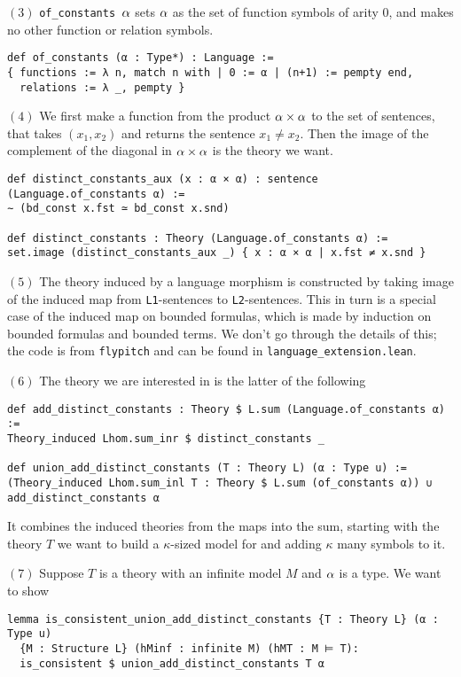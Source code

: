 $(3)$ \texttt{of\_constants $\alpha$} sets $\alpha$ as the set of function symbols
of arity $0$, and makes no other function or relation symbols.
\begin{lstlisting}
def of_constants (α : Type*) : Language :=
{ functions := λ n, match n with | 0 := α | (n+1) := pempty end,
  relations := λ _, pempty } \end{lstlisting}

$(4)$ We first make a function from the product $\alpha \times \alpha$ to
the set of sentences, that takes $(x_1,x_2)$ and returns the sentence
$x_{1} \ne x_{2}$.
Then the image of the complement of the diagonal in $\alpha \times \alpha$
is the theory we want.

\begin{lstlisting}
def distinct_constants_aux (x : α × α) : sentence (Language.of_constants α) :=
∼ (bd_const x.fst ≃ bd_const x.snd)

def distinct_constants : Theory (Language.of_constants α) :=
set.image (distinct_constants_aux _) { x : α × α | x.fst ≠ x.snd } \end{lstlisting}

$(5)$ The theory induced by a language morphism is constructed by
taking image of the induced map from \texttt{L1}-sentences
to \texttt{L2}-sentences.
This in turn is a special case of the induced map on bounded formulas,
which is made by induction on bounded formulas and bounded terms.
We don't go through the details of this;
the code is from \texttt{flypitch} and can be found in
\texttt{language\_extension.lean}.

$(6)$ The theory we are interested in is the latter of the following
\begin{lstlisting}
def add_distinct_constants : Theory $ L.sum (Language.of_constants α) :=
Theory_induced Lhom.sum_inr $ distinct_constants _

def union_add_distinct_constants (T : Theory L) (α : Type u) :=
(Theory_induced Lhom.sum_inl T : Theory $ L.sum (of_constants α)) ∪ add_distinct_constants α \end{lstlisting}
It combines the induced theories from the maps into the sum,
starting with the theory $T$ we want to build a $\kappa$-sized
model for and adding $\kappa$ many symbols to it.

$(7)$ Suppose $T$ is a theory with an infinite model $M$ and $\alpha$ is a type.
We want to show

\begin{lstlisting}
lemma is_consistent_union_add_distinct_constants {T : Theory L} (α : Type u)
  {M : Structure L} (hMinf : infinite M) (hMT : M ⊨ T):
  is_consistent $ union_add_distinct_constants T α
\end{lstlisting}


